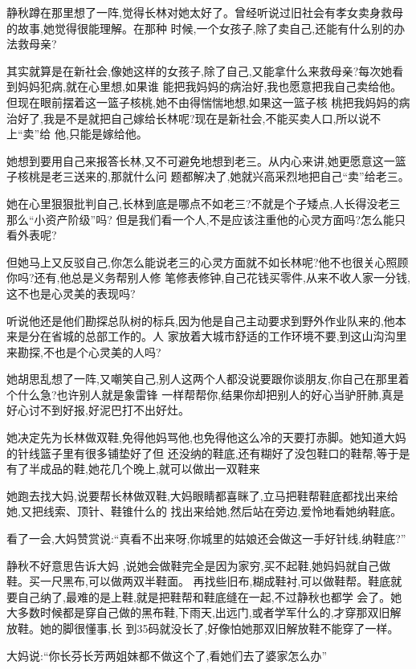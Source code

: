 ﻿\documentclass[12pt]{article}
\begin{document}
静秋蹲在那里想了一阵,觉得长林对她太好了。曾经听说过旧社会有孝女卖身救母的故事,她觉得很能理解。在那种
时候,一个女孩子,除了卖自己,还能有什么别的办法救母亲?

其实就算是在新社会,像她这样的女孩子,除了自己,又能拿什么来救母亲?每次她看到妈妈犯病,就在心里想,如果谁
能把我妈妈的病治好,我也愿意把我自己卖给他。但现在眼前摆着这一篮子核桃,她不由得惴惴地想,如果这一篮子核
桃把我妈妈的病治好了,我是不是就把自己\myrule 嫁给长林呢?现在是新社会,不能买卖人口,所以说不上``卖''给
他,只能是嫁给他。

她想到要用自己来报答长林,又不可避免地想到老三。从内心来讲,她更愿意这一篮子核桃是老三送来的,那就什么问
题都解决了,她就兴高采烈地把自己``卖''给老三。

她在心里狠狠批判自己,长林到底是哪点不如老三?不就是个子矮点,人长得没老三那么\myrule ``小资产阶级''吗?
但是我们看一个人,不是应该注重他的心灵方面吗?怎么能只看外表呢?

但她马上又反驳自己,你怎么能说老三的心灵方面就不如长林呢?他不也很关心照顾你吗?还有,他总是义务帮别人修
笔修表修钟,自己花钱买零件,从来不收人家一分钱,这不也是心灵美的表现吗?

听说他还是他们勘探总队树的标兵,因为他是自己主动要求到野外作业队来的,他本来是分在省城的总部工作的。人
家放着大城市舒适的工作环境不要,到这山沟沟里来勘探,不也是个心灵美的人吗?

她胡思乱想了一阵,又嘲笑自己,别人这两个人都没说要跟你谈朋友,你自己在那里着个什么急?也许别人就是象雷锋
一样帮帮你,结果你却把别人的好心当驴肝肺,真是好心讨不到好报,好泥巴打不出好灶。

她决定先为长林做双鞋,免得他妈骂他,也免得他这么冷的天要打赤脚。她知道大妈的针线篮子里有很多铺垫好了但
还没纳的鞋底,还有糊好了没包鞋口的鞋帮,等于是有了半成品的鞋,她花几个晚上,就可以做出一双鞋来

她跑去找大妈,说要帮长林做双鞋,大妈眼睛都喜眯了,立马把鞋帮鞋底都找出来给她,又把线索、顶针、鞋锥什么的
找出来给她,然后站在旁边,爱怜地看她纳鞋底。

看了一会,大妈赞赏说:``真看不出来呀,你城里的姑娘还会做这一手好针线,纳鞋底?''

静秋不好意思告诉大妈 ,说她会做鞋完全是因为家穷,买不起鞋,她妈妈就自己做鞋。买一尺黑布,可以做两双半鞋面。
再找些旧布,糊成鞋衬,可以做鞋帮。鞋底就要自己纳了,最难的是上鞋,就是把鞋帮和鞋底缝在一起,不过静秋也都学
会了。她大多数时候都是穿自己做的黑布鞋,下雨天,出远门,或者学军什么的,才穿那双旧解放鞋。她的脚很懂事,长
到35码就没长了,好像怕她那双旧解放鞋不能穿了一样。

大妈说:``你长芬长芳两姐妹都不做这个了,看她们去了婆家怎么办\myrule ''
\end{document}
